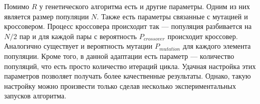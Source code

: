 \begin{spacing}{1.3}
Помимо $R$  у генетического алгоритма есть и другие параметры. Одним из них является размер популяции $N$. Также есть параметры связанные с мутацией и кроссовером. Процесс кроссовера происходит так --- популяция разбивается на $N/2$ пар и для каждой пары с вероятность $P_{crossover}$ происходит кроссовер. Аналогично существует и вероятность мутации $P_{mutation}$ для каждого элемента популяции. Кроме того, в данной адаптации есть параметр --- количество популяций, что есть просто количество итераций цикла. Удачная настройка этих параметров позволяет получать более качественные результаты. Однако, такую настройку можно произвести только сделав несколько  экспериментальных запусков алгоритма.




\end{spacing}